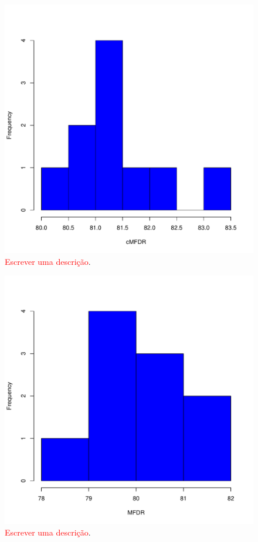 \documentclass[conference]{IEEEtran}
\begin{document}
\begin{figure}[h]
	\centering
	\includegraphics[width=\linewidth]{img/bluehist_cmfdr.pdf}
	\caption{\textcolor{red}{Escrever uma descrição}.}
	\label{fig:hist_cmfdr}
\end{figure}

\begin{figure}[h]
	\centering
	\includegraphics[width=\linewidth]{img/bluehist_mfdr.pdf}
	\caption{\textcolor{red}{Escrever uma descrição}.}
	\label{fig:hist_mfdr}
\end{figure}
\end{document}
